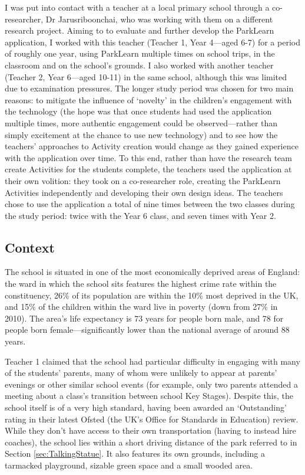 I was put into contact with a teacher at a local primary school through a co-researcher, Dr Jarusriboonchai, who was working with them on a different research project. Aiming to to evaluate and further develop the ParkLearn application, I worked with this teacher (Teacher 1, Year 4---aged 6-7) for a period of roughly one year, using ParkLearn multiple times on school trips, in the classroom and on the school's grounds. I also worked with another teacher (Teacher 2, Year 6---aged 10-11) in the same school, although this was limited due to examination pressures. The longer study period was chosen for two main reasons: to mitigate the influence of `novelty' in the children’s engagement with the technology (the hope was that once students had used the application multiple times, more authentic engagement could be observed---rather than simply excitement at the chance to use new technology) \citep{Sharples2013} and to see how the teachers' approaches to Activity creation would change as they gained experience with the application over time. To this end, rather than have the research team create Activities for the students complete, the teachers used the application at their own volition: they took on a co-researcher role, creating the ParkLearn Activities independently and developing their own design ideas. The teachers chose to use the application a total of nine times between the two classes during the study period: twice with the Year 6 class, and seven times with Year 2.

\subsection{Context}
The school is situated in one of the most economically deprived areas of England: the ward in which the school sits features the highest crime rate within the constituency, 26\% of its population are within the 10\% most deprived in the UK, and 15\% of the children within the ward live in poverty (down from 27\% in 2010). The area's life expectancy is 73 years for people born male, and 78 for people born female---significantly lower than the national average of around 88 years.

Teacher 1 claimed that the school had particular difficulty in engaging with many of the students' parents, many of whom were unlikely to appear at parents' evenings or other similar school events (for example, only two parents attended a meeting about a class's transition between school Key Stages). Despite this, the school itself is of a very high standard, having been awarded an `Outstanding' rating in their latest Ofsted (the UK’s Office for Standards in Education) review. While they don't have access to their own transportation (having to instead hire coaches), the school lies within a short driving distance of the park referred to in Section \ref{sec:TalkingStatue}. It also features its own grounds, including a tarmacked playground, sizable green space and a small wooded area.

